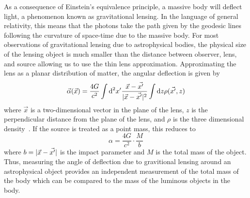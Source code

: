 As a consequence of Einstein's equivalence principle, a massive body will deflect light, a phenomenon known as gravitational lensing.
In the language of general relativity, this means that the photons take the path given by the geodesic lines following the curvature of space-time due to the massive body.
For most observations of gravitational lensing due to astrophysical bodies, the physical size of the lensing object is much smaller than the distance between observer, lens, and source allowing us to use the thin lens approximation.
Approximating the lens as a planar distribution of matter, the angular deflection is given by 
\begin{equation}
  \vec \alpha (\vec x) = \frac{4G}{c^2} \int \text{d}^2 x' \frac{\vec x - \vec {x'}}{\lvert \vec x - \vec{x'} \rvert^2} 
  \int \text{d} z \rho(\vec{x'}, z)
\end{equation}
where $\vec x$ is a two-dimensional vector in the plane of the lens, $z$ is the perpendicular distance from the plane of the lens, and $\rho$ is the three dimensional density~\cite{Massey2010}.
If the source is treated as a point mass, this reduces to
\begin{equation}
  \alpha = \frac{ 4 G} {c^2} \cdot \frac{M}{b}
\end{equation}
where $b = \lvert \vec x - \vec{x'} \rvert$ is the impact parameter and $M$ is the total mass of the object.
Thus, measuring the angle of deflection due to gravitional lensing around an astrophysical object provides an independent measurement of the total mass of the body which can be compared to the mass of the luminous objects in the body.

